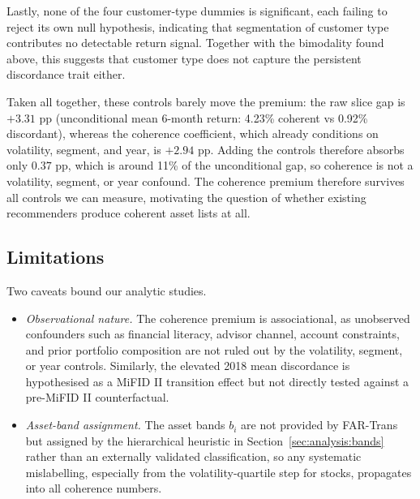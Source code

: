 Lastly, none of the four customer-type dummies is significant, each failing to reject its own null hypothesis, indicating that segmentation of customer type contributes no detectable return signal. Together with the bimodality found above, this suggests that customer type does not capture the persistent discordance trait either.

Taken all together, these controls barely move the premium: the raw slice gap is $+3.31$ pp (unconditional mean 6-month return: 4.23\% coherent vs 0.92\% discordant), whereas the coherence coefficient, which already conditions on volatility, segment, and year, is $+2.94$ pp. Adding the controls therefore absorbs only $0.37$ pp, which is around 11\% of the unconditional gap, so coherence is not a volatility, segment, or year confound. The coherence premium therefore survives all controls we can measure, motivating the question of whether existing recommenders produce coherent asset lists at all.

\subsection{Limitations}
\label{sec:analysis:limitations}

Two caveats bound our analytic studies.

\begin{itemize}
    \item \textit{Observational nature.} The coherence premium is associational, as unobserved confounders such as financial literacy, advisor channel, account constraints, and prior portfolio composition are not ruled out by the volatility, segment, or year controls. Similarly, the elevated 2018 mean discordance is hypothesised as a MiFID II transition effect but not directly tested against a pre-MiFID II counterfactual.
    \item \textit{Asset-band assignment.} The asset bands $b_i$ are not provided by FAR-Trans but assigned by the hierarchical heuristic in Section~\ref{sec:analysis:bands} rather than an externally validated classification, so any systematic mislabelling, especially from the volatility-quartile step for stocks, propagates into all coherence numbers.
\end{itemize}
